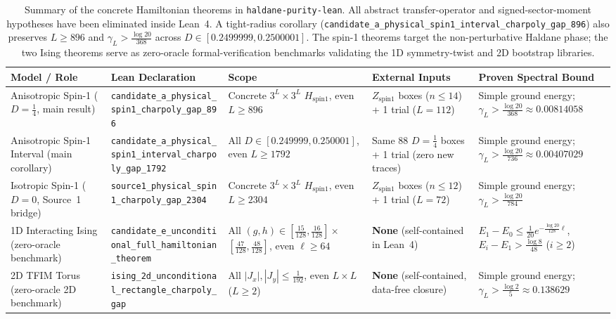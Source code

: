 \documentclass[11pt,a4paper]{article}
\newcommand{\id}[1]{{\small\nolinkurl{#1}}}
\begin{document}
\begin{table}[t]
\centering
\footnotesize
\setlength{\tabcolsep}{3.5pt}
\renewcommand{\id}[1]{{\scriptsize\nolinkurl{#1}}}
\begin{tabularx}{\textwidth}{@{}>{\raggedright\arraybackslash}p{2.3cm}>{\raggedright\arraybackslash}p{3.65cm}>{\raggedright\arraybackslash}p{2.65cm}>{\raggedright\arraybackslash}p{2.2cm}>{\raggedright\arraybackslash}X@{}}
\toprule
\textbf{Model / Role} & \textbf{Lean Declaration} & \textbf{Scope} & \textbf{External Inputs} & \textbf{Proven Spectral Bound} \\
\midrule
Anisotropic Spin-1 ($D=\frac{1}{4}$, main result) & \id{candidate_a_physical_spin1_charpoly_gap_896} & Concrete $3^L\times 3^L$ $H_{\mathrm{spin1}}$, even $L \ge 896$ & 88 $Z_{\mathrm{spin1}}$ boxes ($n\le 14$) + 1 trial ($L=112$) & Simple ground energy; $\gamma_L > \frac{\log 20}{368} \approx 0.00814058$ \\
\addlinespace
Anisotropic Spin-1 Interval (main corollary) & \id{candidate_a_physical_spin1_interval_charpoly_gap_1792} & All $D \in [0.249999, 0.250001]$, even $L \ge 1792$ & Same 88 $D=\frac{1}{4}$ boxes + 1 trial (zero new traces) & Simple ground energy; $\gamma_L > \frac{\log 20}{736} \approx 0.00407029$ \\
\addlinespace
Isotropic Spin-1 ($D=0$, Source~1 bridge) & \id{source1_physical_spin1_charpoly_gap_2304} & Concrete $3^L\times 3^L$ $H_{\mathrm{spin1}}$, even $L \ge 2304$ & 18 $Z_{\mathrm{spin1}}$ boxes ($n\le 12$) + 1 trial ($L=72$) & Simple ground energy; $\gamma_L > \frac{\log 20}{784}$ \\
\addlinespace
1D Interacting Ising (zero-oracle benchmark) & \id{candidate_e_unconditional_full_hamiltonian_theorem} & All $(g,h) \in [\frac{15}{128},\frac{16}{128}]\times$ $[\frac{47}{128},\frac{48}{128}]$, even $\ell \ge 64$ & \textbf{None} (self-contained in Lean~4) & $E_1 - E_0 \le \frac{1}{20}e^{-\frac{\log 20}{128}\ell}$, $E_i - E_1 > \frac{\log 8}{48}$ ($i \ge 2$) \\
\addlinespace
2D TFIM Torus (zero-oracle 2D benchmark) & \id{ising_2d_unconditional_rectangle_charpoly_gap} & All $|J_x|,|J_y|\le \frac{1}{192}$, even $L \times L$ ($L \ge 2$) & \textbf{None} (self-contained, data-free closure) & Simple ground energy; $\gamma_L > \frac{\log 2}{5} \approx 0.138629$ \\
\bottomrule
\end{tabularx}
\caption{Summary of the concrete Hamiltonian theorems in \id{haldane-purity-lean}. All abstract transfer-operator and signed-sector-moment hypotheses have been eliminated inside Lean~4. A tight-radius corollary (\id{candidate_a_physical_spin1_interval_charpoly_gap_896}) also preserves $L \ge 896$ and $\gamma_L > \frac{\log 20}{368}$ across $D \in [0.2499999, 0.2500001]$. The spin-1 theorems target the non-perturbative Haldane phase; the two Ising theorems serve as zero-oracle formal-verification benchmarks validating the 1D symmetry-twist and 2D bootstrap libraries.}
\label{tab:summary}
\end{table}
\end{document}
